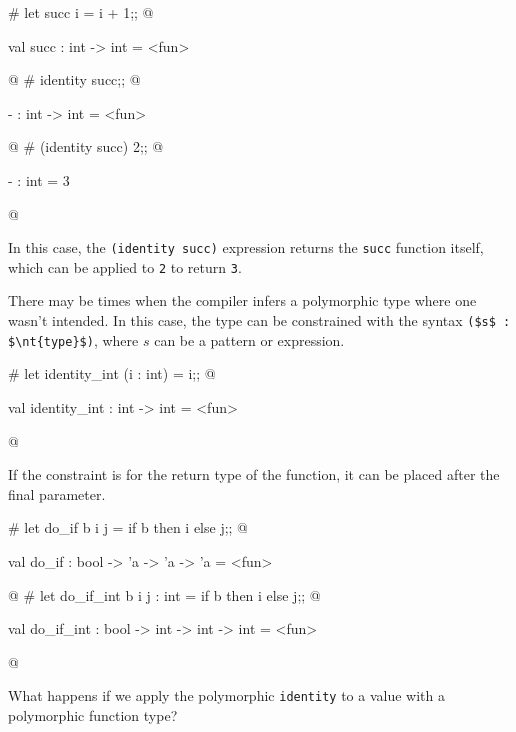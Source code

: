 \begin{ocaml}
# let succ i = i + 1;;
@
\begin{topoutput}
val succ : int -> int = <fun>
\end{topoutput}
@
# identity succ;;
@
\begin{topoutput}
- : int -> int = <fun>
\end{topoutput}
@
# (identity succ) 2;;
@
\begin{topoutput}
- : int = 3
\end{topoutput}
@
\end{ocaml}
%
In this case, the \hbox{\hbox{\lstinline/(identity succ)/}} expression returns the
\hbox{\hbox{\lstinline/succ/}} function itself, which can be applied to \hbox{\lstinline/2/} to
return \hbox{\hbox{\lstinline/3/}}.

\label{keyword::}
There may be times when the compiler infers a polymorphic type where one wasn't intended.
In this case, the type can be constrained with the syntax \hbox{\lstinline/($s$ : $\nt{type}$)/},
where $s$ can be a pattern or expression.

\begin{ocaml}
# let identity_int (i : int) = i;;
@
\begin{topoutput}
val identity_int : int -> int = <fun>
\end{topoutput}
@
\end{ocaml}
%
If the constraint is for the return type of the function, it can be
placed after the final parameter.

\begin{ocaml}
# let do_if b i j = if b then i else j;;
@
\begin{topoutput}
val do_if : bool -> 'a -> 'a -> 'a = <fun>
\end{topoutput}
@
# let do_if_int b i j : int = if b then i else j;;
@
\begin{topoutput}
val do_if_int : bool -> int -> int -> int = <fun>
\end{topoutput}
@
\end{ocaml}


What happens if we apply the
polymorphic \hbox{\hbox{\lstinline/identity/}} to a value with a
polymorphic function type?

